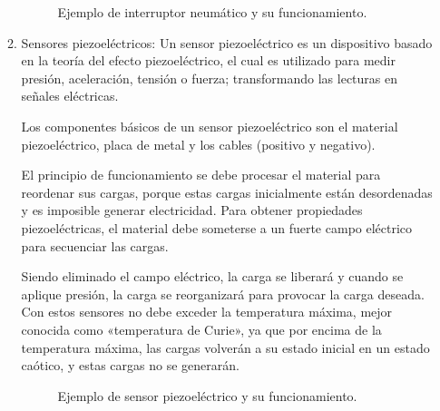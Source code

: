 \begin{enumerate}
\begin{enumerate}
			\begin{figure}[h]
				\centering
				\hspace{0.5cm} %
				\caption{Ejemplo de interruptor neumático y su funcionamiento.}
				\label{fig:NeumáticoGeneral}
			\end{figure}
			
			\item Sensores piezoeléctricos: Un sensor piezoeléctrico es un dispositivo basado en la teoría del efecto piezoeléctrico, el cual es utilizado para medir presión, aceleración, tensión o fuerza; transformando las lecturas en señales eléctricas.
			
			Los componentes básicos de un sensor piezoeléctrico son el material piezoeléctrico, placa de metal y los cables (positivo y negativo).
			
			El principio de funcionamiento se debe procesar el material para reordenar sus cargas, porque estas cargas inicialmente están desordenadas y es imposible generar electricidad. Para obtener propiedades piezoeléctricas, el material debe someterse a un fuerte campo eléctrico para secuenciar las cargas.
			
			Siendo eliminado el campo eléctrico, la carga se liberará y cuando se aplique presión, la carga se reorganizará para provocar la carga deseada. Con estos sensores no debe exceder la temperatura máxima, mejor conocida como «temperatura de Curie», ya que por encima de la temperatura máxima, las cargas volverán a su estado inicial en un estado caótico, y estas cargas no se generarán. \cite{SensoresPiezoelectricos}
			
					\begin{figure}[h]
					\centering
						\hspace{0.5cm} %
					\caption{Ejemplo de sensor piezoeléctrico y su funcionamiento.}
					\label{fig:PiezoelectricoGeneral}
				\end{figure}
			

\end{enumerate}
\end{enumerate}
